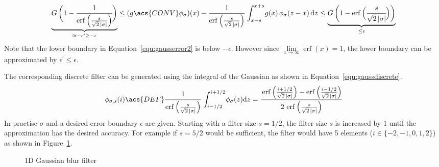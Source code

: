 \documentclass[12pt,a4paper,oneside,openright]{book}
\newcommand{\Eg}{For example }
\newcommand{\equ}[1]{Equation~\ref{equ:#1}}
\newcommand{\fig}[1]{Figure~\ref{fig:#1}}
\begin{document}
\begin{CJK}{UTF8}{}
\begin{equation}\label{equ:gausserror2}
  \underbrace{G\,\bigg(1-\cfrac{1}{\operatorname{erf}\Big(\frac{s}{\sqrt{2}\,|\sigma|}\Big)}\bigg)}_{\approx-\epsilon^\prime\ge-\epsilon}\le(g\acs{CONV}\phi_\sigma)(x)-\cfrac{1}{\operatorname{erf}\Big(\frac{s}{\sqrt{2}\,|\sigma|}\Big)}\,\int_{x-s}^{x+s}\! g(x)\,\phi_\sigma(z-x)\,\mathrm{d}z\le\underbrace{G\,\bigg(1-\operatorname{erf}\Big(\cfrac{s}{\sqrt{2}\,|\sigma|}\Big)\bigg)}_{\le\epsilon}
\end{equation}
Note that the lower boundary in \equ{gausserror2} is below $-\epsilon$. However since $\lim\limits_{x\to\infty}\operatorname{erf}(x)=1$, the lower boundary can be approximated by $\epsilon^\prime\le\epsilon$.

The corresponding discrete filter can be generated using the integral of the Gaussian as shown in \equ{gaussdiscrete}.
\begin{equation}\label{equ:gaussdiscrete}
  \phi_{\sigma,s}(i)\acs{DEF}\cfrac{1}{\operatorname{erf}\Big(\frac{s}{\sqrt{2}\,|\sigma|}\Big)}\,\int_{i-1/2}^{i+1/2}\! \phi_\sigma(z)\mathrm{d}z=\cfrac{\operatorname{erf}\Big(\frac{i+1/2}{\sqrt{2}\,|\sigma|}\Big)-\operatorname{erf}\Big(\frac{i-1/2}{\sqrt{2}\,|\sigma|}\Big)}{2\,\operatorname{erf}\Big(\frac{s}{\sqrt{2}\,|\sigma|}\Big)}
\end{equation}
In practise $\sigma$ and a desired error boundary $\epsilon$ are given. Starting with a filter size $s=1/2$, the filter size $s$ is increased by $1$ until the approximation has the desired accuracy. \Eg if $s=5/2$ would be sufficient, the filter would have 5 elements ($i\in\{-2,-1,0,1,2\}$) as shown in \fig{sgauss}.
\begin{figure}[htbp]
  \begin{center}
    \caption{\acs{1D} Gaussian blur filter\label{fig:sgauss}}
  \end{center}
\end{figure}


\end{CJK}
\end{document}
